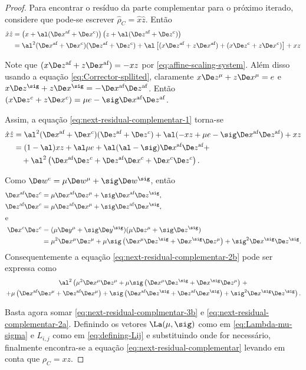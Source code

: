 \begin{proof} 
Para encontrar o resíduo da parte complementar para o próximo iterado,
considere que pode-se escrever
 $\hat{\rho}_C  =
\hat{x}\hat{z}$. Então
\begin{align}
\hat{x}\hat{z} & = \left(x + \al(\dex + \Decox) \right)\left( z + \al(\dez + \Decoz
)\right) \notag \\
& = \al^2(\dex+\Decox)(\dez + \Decoz) +  \al\left[  (x\dez+z\dex) +
(x\Decoz + z\Decox)\right] + xz \label{eq:next-residual-complementar-1}
\end{align}


Note que  $ (x\dez+z\dex) = -xz$ por \eqref{eq:affine-scaling-system}. Além
disso usando a equação \eqref{eq:Corrector-spllited}, claramente  $x\Dez^\mu +
z\Dex^\mu = e$ e $x\Dez^\sig + z\Dex^\sig = - \dex\dez$. Então $(x\Dez^c +
z\Dex^c) = \mu e - \sig\dex\dez$.
 
Assim, a equação \eqref{eq:next-residual-complementar-1} torna-se
\begin{subequations}
\begin{align}
\hat{x}\hat{z} & =  \al^2(\dex + \Dex^c)(\dez + \Dez^c) + \al (-xz + \mu   e
- \sig\dex\dez) + xz \notag\\
& = (1-\al) xz + \al\mu e +
\al(\al-\sig)\dex\dez    +
\label{eq:next-residual-complementar-2a} \\
& \quad + \al^2\left(\dex\Dez^c + \dez\Dex^c + \Dex^c\Dez^c\right).
\label{eq:next-residual-complementar-2b}
\end{align}
\end{subequations}

Como $\Decow = \mu\Dew^\mu + \sig\Dew^\sig$, então
\begin{align*}
\dex\Dez^c &=  \mu\dex\Dez^\mu + \sig\dex\Dez^\sig,\\
\dez\Dex^c &=  \mu\dez\Dex^\mu + \sig\dez\Dex^\sig,\\
\intertext{e}
\Dex^c\Dez^c& =   (\mu\Dey^\mu + \sig\Dey^\sig) (\mu\Dez^\mu
			+ \sig\Dez^\sig) \\ 
			& = \mu^2\Dex^\mu\Dez^\mu + \mu\sig \left(\Dex^\mu\Dez^\sig +
			\Dex^\sig\Dez^\mu \right) + \sig^2\Dex^\sig\Dez^\sig.
\end{align*}
Consequentemente a equação \eqref{eq:next-residual-complementar-2b} pode ser
expressa como
\begin{multline}
\label{eq:next-residual-complmentar-3b}
\al^2\left(\mu^2\Dex^\mu\Dez^\mu + \mu\sig \left(\Dex^\mu\Dez^\sig +
			\Dex^\sig\Dez^\mu \right) \right. +  \\ \left. + \mu\left(\dex\Dez^\mu +
			\dez\Dex^\mu \right) +   \sig\left(\dex\Dez^\sig + \dez\Dex^\sig\right) +
			\sig^2\Dex^\sig\Dez^\sig \right).
\end{multline}


Basta agora somar  \eqref{eq:next-residual-complmentar-3b}  e
 \eqref{eq:next-residual-complementar-2a}. Definindo os vetores
$\La(\mu,\sig)$ como em \eqref{eq:Lambda-mu-sigma} e $L_{i,j}$ como em
\eqref{eq:defining-Lij} e substituindo onde for necessário, finalmente
encontra-se a equação \eqref{eq:next-residual-complementar} levando em conta que $\rho_C = xz$.
\end{proof} 


